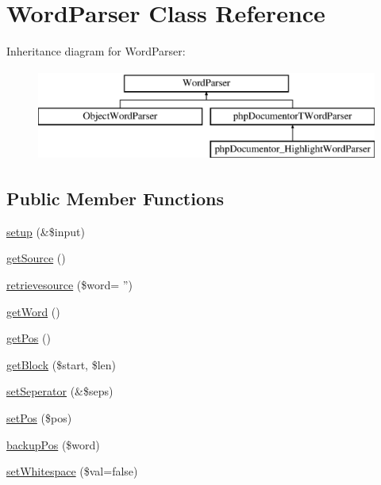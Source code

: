 \hypertarget{class_word_parser}{\section{\-Word\-Parser \-Class \-Reference}
\label{class_word_parser}
}
\-Inheritance diagram for \-Word\-Parser\-:\begin{figure}[H]
\begin{center}
\leavevmode
\includegraphics[height=3.000000cm]{class_word_parser}
\end{center}
\end{figure}
\subsection*{\-Public \-Member \-Functions}
\begin{DoxyCompactItemize}
\item 
\hyperlink{class_word_parser_a1545e049222168d79849355fe4343067}{setup} (\&\$input)
\item 
\hyperlink{class_word_parser_a42fdd8313c99d9c5f80219c1e192b93a}{get\-Source} ()
\item 
\hyperlink{class_word_parser_a1a5cf13738ae1d5efdb026c476ea124d}{retrievesource} (\$word= '')
\item 
\hyperlink{class_word_parser_aed2fad5b3be15693fc9b44b7b73af497}{get\-Word} ()
\item 
\hyperlink{class_word_parser_a43d77d82832dbc67ef4bb57a0988e246}{get\-Pos} ()
\item 
\hyperlink{class_word_parser_a3fc898fea982c2c9f2ab68ba5b8d1086}{get\-Block} (\$start, \$len)
\item 
\hyperlink{class_word_parser_a83d4df55eca4d93bebc1fb51d3a0b70d}{set\-Seperator} (\&\$seps)
\item 
\hyperlink{class_word_parser_a06d8e83b84cf0457653435ac93076f79}{set\-Pos} (\$pos)
\item 
\hyperlink{class_word_parser_a93ef3f1a6d23b14b8ded33b578db290e}{backup\-Pos} (\$word)
\item 
\hyperlink{class_word_parser_a6b3c5739a63c39226c2f0273eb2f24a2}{set\-Whitespace} (\$val=false)
\end{DoxyCompactItemize}
